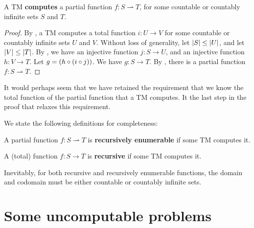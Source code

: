 \begin{theorem} \label{thm:tm-partial} A TM \textbf{computes} a partial
function $f : S \rightharpoonup T$, for some countable or countably infinite
sets $S$ and $T$.\end{theorem}

\begin{proof} By , a TM computes a total function $i : U
\rightarrow V$ for some countable or countably infinite sets $U$ and $V$.
Without loss of generality, let $\mathopen{}\left|{S}\right|\mathclose{}\leq\mathopen{}\left|{U}\right|\mathclose{}$, and let
$\mathopen{}\left|{V}\right|\mathclose{}\leq\mathopen{}\left|{T}\right|\mathclose{}$. By , we have an injective function $j
: S \rightarrow U$, and an injective function $h : V \rightarrow T$. Let
$g=\mathopen{}\left({h \circ \mathopen{}\left({i \circ j}\right)\mathclose{}}\right)\mathclose{}$. We have $g : S \rightarrow T$. By
, there is a partial function $f : S \rightharpoonup
T$.\end{proof}

\begin{remark} It would perhaps seem that we have retained the requirement that
we know the total function of the partial function that a TM computes. It the
last step in the proof that relaxes this requirement. \end{remark}

We state the following definitions for completeness:

\begin{definition} A partial function $f : S \rightharpoonup T$ is
\textbf{recursively enumerable} if some TM computes it. \end{definition}

\begin{definition} A (total) function $f : S \rightarrow T$ is
\textbf{recursive} if some TM computes it. \end{definition}

Inevitably, for both recursive and recursively enumerable functions, the domain
and codomain must be either countable or countably infinite sets.

\section{Some uncomputable problems}
